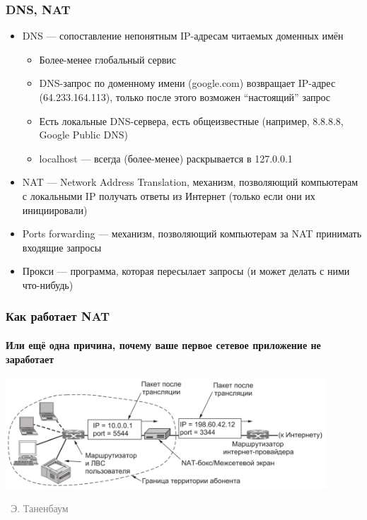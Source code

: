 \documentclass[xetex,mathserif,serif]{beamer}
\newcommand{\attribution}[1] {
\vspace{-5mm}\begin{flushright}\begin{scriptsize}\textcolor{gray}{\textcopyright\, #1}\end{scriptsize}\end{flushright}
}
\begin{document}
	\begin{frame}
		\frametitle{DNS, NAT}
		\begin{itemize}
			\item DNS --- сопоставление непонятным IP-адресам читаемых доменных имён
			\begin{itemize}
				\item Более-менее глобальный сервис
				\item DNS-запрос по доменному имени (google.com) возвращает IP-адрес (64.233.164.113), только после этого возможен ``настоящий'' запрос
				\item Есть локальные DNS-сервера, есть общеизвестные (например, 8.8.8.8, Google Public DNS)
				\item localhost --- всегда (более-менее) раскрывается в 127.0.0.1
			\end{itemize}
			\item NAT --- Network Address Translation, механизм, позволяющий компьютерам с локальными IP получать ответы из Интернет (только если они их инициировали)
			\item Ports forwarding --- механизм, позволяющий компьютерам за NAT принимать входящие запросы
			\item Прокси --- программа, которая пересылает запросы (и может делать с ними что-нибудь)
		\end{itemize}
	\end{frame}

	\begin{frame}
		\frametitle{Как работает NAT}
		\framesubtitle{Или ещё одна причина, почему ваше первое сетевое приложение не заработает}
		\begin{center}
			\includegraphics[width=0.9\textwidth]{nat.png}
			\attribution{Э. Таненбаум}
		\end{center}
	\end{frame}
\end{document}
